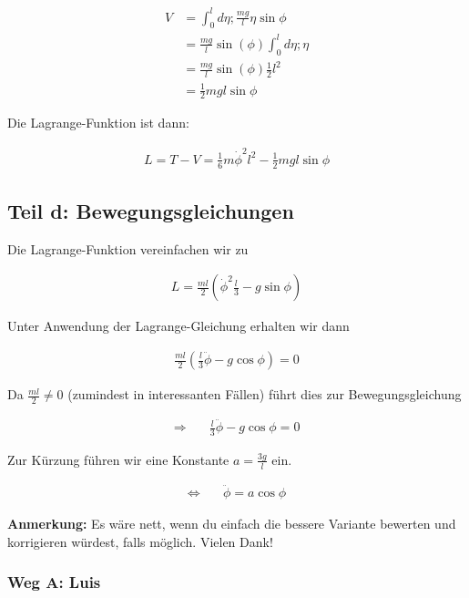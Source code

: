 \documentclass[a4paper,german,12pt,smallheadings]{scrartcl}
\begin{document}
\begin{align*}
  V &= \int_0^l d \eta; \frac{mg}{l} \eta \sin \phi \\
    &= \frac{mg}{l} \sin(\phi) \int_0^l d \eta; \eta \\
    &= \frac{mg}{l} \sin(\phi) \frac{1}{2} l^2 \\
    &= \frac{1}{2} mgl \sin \phi
\end{align*}

Die Lagrange-Funktion ist dann:

\begin{align*}
  L = T - V = \frac{1}{6} m \dot{\phi}^2 l^2 - \frac{1}{2} mgl \sin \phi
\end{align*}

\subsection*{Teil d: Bewegungsgleichungen}

Die Lagrange-Funktion vereinfachen wir zu

\begin{align*}
  L = \frac{ml}{2}\left(\dot{\phi}^2 \frac{l}{3} - g \sin \phi\right)
\end{align*}

Unter Anwendung der Lagrange-Gleichung erhalten wir dann

\begin{align*}
  \frac{ml}{2} \left(\frac{l}{3} \ddot{\phi} - g \cos \phi\right) = 0
\end{align*}

Da $\frac{ml}{2} \neq 0$ (zumindest in interessanten Fällen) führt dies zur Bewegungsgleichung

\begin{align*}
  \Rightarrow\quad&\frac{l}{3} \ddot{\phi} - g \cos \phi = 0
\end{align*}

Zur Kürzung führen wir eine Konstante $a = \frac{3g}{l}$ ein.

\begin{align*}
  \Leftrightarrow\quad&\ddot{\phi} = a \cos \phi
\end{align*}

\textbf{Anmerkung:} Es wäre nett, wenn du einfach die bessere Variante bewerten und korrigieren würdest, falls möglich. Vielen Dank!

\subsubsection*{Weg A: Luis}
\end{document}
